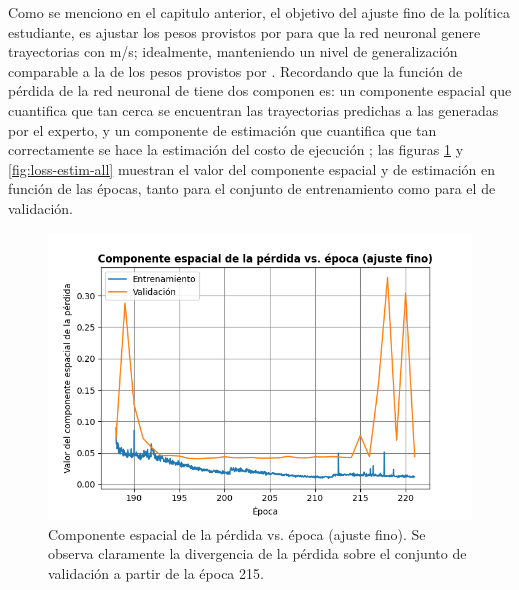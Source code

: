\label{sec:results-finetune}

Como se menciono en el capitulo anterior, el objetivo del ajuste fino de la política estudiante, es ajustar los pesos provistos por \cite{Loquercio2021} para que la red neuronal genere trayectorias con  m/s; idealmente, manteniendo un nivel de generalización comparable a la de los pesos provistos por \cite{Loquercio2021}. Recordando que la función de pérdida de la red neuronal de \cite{Loquercio2021} tiene dos componen es: un componente espacial que cuantifica que tan cerca se encuentran las trayectorias predichas a las generadas por el experto, y un componente de estimación que cuantifica que tan correctamente se hace la estimación del costo de ejecución ; las figuras \ref{fig:loss-space-all} y \ref{fig:loss-estim-all} muestran el valor del componente espacial y de estimación en función de las épocas, tanto para el conjunto de entrenamiento como para el de validación.

\begin{figure}[H]
    \centering
    \includegraphics[scale=0.65]{partes/img/loss-space-all.png}
    \caption[Componente espacial de la pérdida vs. época (ajuste fino).]{Componente espacial de la pérdida vs. época (ajuste fino). Se observa claramente la divergencia de la pérdida sobre el conjunto de validación a partir de la época 215.}
    \label{fig:loss-space-all}
\end{figure}

